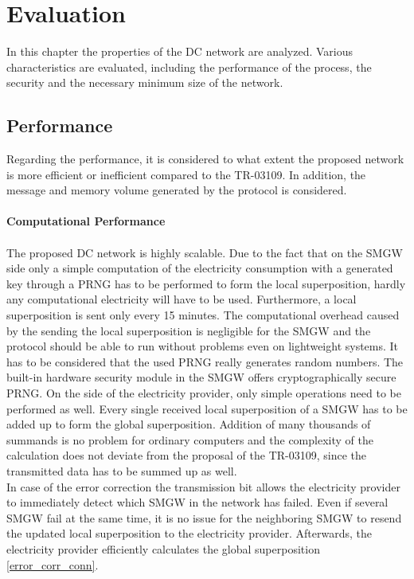 

\section{Evaluation}
\label{Evaluation}
In this chapter the properties of the DC network are analyzed. Various characteristics are evaluated, including the performance of the process, the security and the necessary minimum size of the network.
\subsection{Performance}
\label{performance}
Regarding the performance, it is considered to what extent the proposed network is more efficient or inefficient compared to the \gls{TR-03109}. In addition, the message and memory volume generated by the protocol is considered.
\\
\\
\textbf{Computational Performance}
\\
\\
The proposed DC network is highly scalable. Due to the fact that on the \gls{SMGW} side only a simple computation of the electricity consumption with a generated key through a \gls{PRNG} has to be performed to form the local superposition, hardly any computational electricity will have to be used. Furthermore, a local superposition is sent only every 15 minutes. The computational overhead caused by the sending the local superposition is negligible for the \gls{SMGW} and the protocol should be able to run without problems even on lightweight systems. It has to be considered that the used \gls{PRNG} really generates random numbers. The built-in hardware security module in the \gls{SMGW} offers cryptographically secure \gls{PRNG}. On the side of the electricity provider, only simple operations need to be performed as well. Every single received local superposition of a \gls{SMGW} has to be added up to form the global superposition. Addition of many thousands of summands is no problem for ordinary computers and the complexity of the calculation does not deviate from the proposal of the \gls{TR-03109}, since the transmitted data has to be summed up as well.\\
In case of the error correction the transmission bit allows the electricity provider to immediately detect which \gls{SMGW} in the network has failed. Even if several \gls{SMGW} fail at the same time, it is no issue for the neighboring \gls{SMGW} to resend the updated local superposition to the electricity provider. Afterwards, the electricity provider efficiently calculates the global superposition \ref{error_corr_conn}.\\
